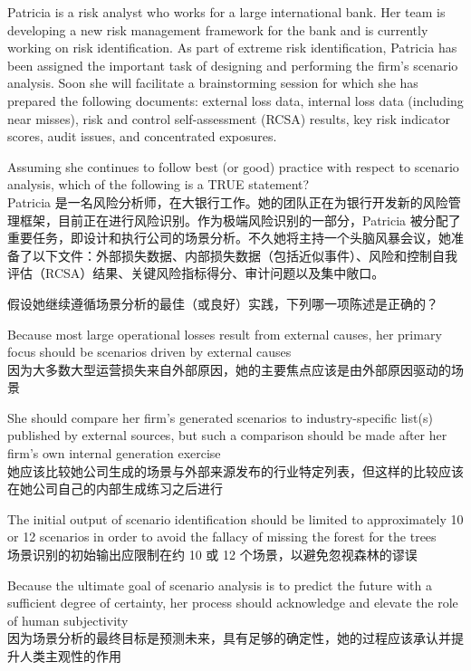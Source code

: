 \documentclass{article}
\newcounter{question} %
\begin{document}
\begin{question}
    Patricia is a risk analyst who works for a large international bank. Her team is developing a new risk management framework for the bank and is currently working on risk identification. As part of extreme risk identification, Patricia has been assigned the important task of designing and performing the firm's scenario analysis. Soon she will facilitate a brainstorming session for which she has prepared the following documents: external loss data, internal loss data (including near misses), risk and control self-assessment (RCSA) results, key risk indicator scores, audit issues, and concentrated exposures.

    Assuming she continues to follow best (or good) practice with respect to scenario analysis, which of the following is a TRUE statement?\\
    Patricia 是一名风险分析师，在大银行工作。她的团队正在为银行开发新的风险管理框架，目前正在进行风险识别。作为极端风险识别的一部分，Patricia 被分配了重要任务，即设计和执行公司的场景分析。不久她将主持一个头脑风暴会议，她准备了以下文件：外部损失数据、内部损失数据（包括近似事件）、风险和控制自我评估（RCSA）结果、关键风险指标得分、审计问题以及集中敞口。

    假设她继续遵循场景分析的最佳（或良好）实践，下列哪一项陈述是正确的？
\end{question}

\begin{choices}
    \item Because most large operational losses result from external causes, her primary focus should be scenarios driven by external causes\\
    因为大多数大型运营损失来自外部原因，她的主要焦点应该是由外部原因驱动的场景
    \item She should compare her firm's generated scenarios to industry-specific list(s) published by external sources, but such a comparison should be made after her firm's own internal generation exercise\\
    她应该比较她公司生成的场景与外部来源发布的行业特定列表，但这样的比较应该在她公司自己的内部生成练习之后进行
    \item The initial output of scenario identification should be limited to approximately 10 or 12 scenarios in order to avoid the fallacy of missing the forest for the trees\\
    场景识别的初始输出应限制在约 10 或 12 个场景，以避免忽视森林的谬误
    \item Because the ultimate goal of scenario analysis is to predict the future with a sufficient degree of certainty, her process should acknowledge and elevate the role of human subjectivity\\
    因为场景分析的最终目标是预测未来，具有足够的确定性，她的过程应该承认并提升人类主观性的作用
\end{choices}
\end{document}
